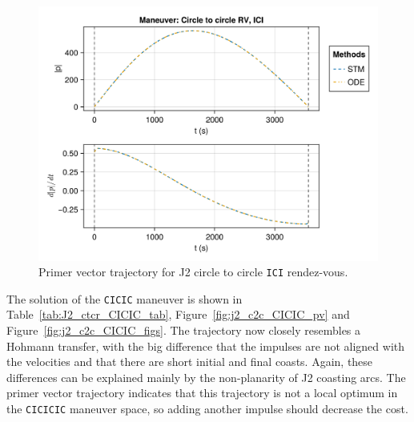 \begin{figure}[htbp]
    \centering
    \includegraphics[width=\linewidth]{../results/j2/hohmann/ICI_primer_vector.png}
    \caption{Primer vector trajectory for J2 circle to circle \texttt{ICI} rendez-vous.}
    \label{fig:j2_c2c_ICI_pv}
\end{figure}

The solution of the \texttt{CICIC} maneuver is shown in Table~\ref{tab:J2_ctcr_CICIC_tab}, Figure~\ref{fig:j2_c2c_CICIC_pv} and Figure~\ref{fig:j2_c2c_CICIC_figs}. The trajectory now closely resembles a Hohmann transfer, with the big difference that the impulses are not aligned with the velocities and that there are short initial and final coasts. Again, these differences can be explained mainly by the non-planarity of J2 coasting arcs. The primer vector trajectory indicates that this trajectory is not a local optimum in the \texttt{CICICIC} maneuver space, so adding another impulse should decrease the cost.

